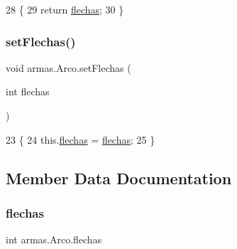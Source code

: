 \begin{DoxyCode}
28     \{
29         \textcolor{keywordflow}{return} \mbox{\hyperlink{classarmas_1_1_arco_a20e5f5a5f70f01f9264a02ff7ee1b657}{flechas}};
30     \}
\end{DoxyCode}
\mbox{\label{classarmas_1_1_arco_a4e931b2d2a8649b74faee40cf06220ec}} 
\subsubsection{\texorpdfstring{set\+Flechas()}{setFlechas()}}
{\footnotesize\ttfamily void armas.\+Arco.\+set\+Flechas (\begin{DoxyParamCaption}\item[{int}]{flechas }\end{DoxyParamCaption})\hspace{0.3cm}{\ttfamily [inline]}}


\begin{DoxyCode}
23     \{
24         this.\mbox{\hyperlink{classarmas_1_1_arco_a20e5f5a5f70f01f9264a02ff7ee1b657}{flechas}} = \mbox{\hyperlink{classarmas_1_1_arco_a20e5f5a5f70f01f9264a02ff7ee1b657}{flechas}};
25     \}
\end{DoxyCode}


\subsection{Member Data Documentation}
\mbox{\label{classarmas_1_1_arco_a20e5f5a5f70f01f9264a02ff7ee1b657}} 
\subsubsection{\texorpdfstring{flechas}{flechas}}
{\footnotesize\ttfamily int armas.\+Arco.\+flechas\hspace{0.3cm}{\ttfamily [private]}}

